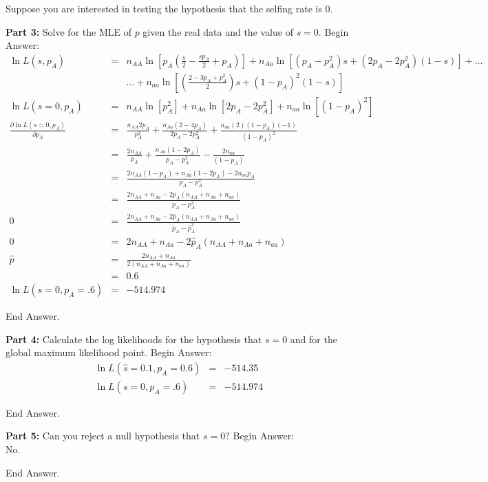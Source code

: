 \documentclass[11pt]{article}
\newcommand{\answer}[1]{{\color{red}\sc Begin Answer:\\}#1{\par\color{red}\sc End Answer.\\}}
\begin{document}
Suppose you are interested in testing the hypothesis that the selfing rate is 0.
\begin{compactenum}
	\item[{\bf Part 3:}] Solve for the MLE of $p$ given the real data and the value of $s = 0$.
\answer{
\begin{eqnarray*}
\ln L (s, p_A) & = &  n_{AA}\ln\left[p_A\left(\frac{s}{2} - \frac{sp_A}{2} + p_A\right)\right] + n_{Aa}\ln\left[(p_A - p_A^2)s + (2p_A - 2p_A^2)(1-s)\right] + \ldots \\
 & & \ldots + n_{aa}\ln\left[\left(\frac{2 - 3p_A + p_A^2}{2}\right)s + (1-p_A)^2(1-s)\right] \\
\ln L (s=0, p_A) & = &   n_{AA}\ln\left[p_A^2\right] + n_{Aa}\ln\left[2p_A - 2p_A^2\right] + n_{aa}\ln\left[(1-p_A)^2\right] \\
\frac{\partial\ln L (s=0, p_A)}{\partial p_A} & = &  \frac{n_{AA}2p_A}{p_A^2} + \frac{n_{Aa}(2-4p_A)}{2p_A - 2p_A^2} + \frac{n_{aa}(2)(1-p_A)(-1)}{(1-p_A)^2}\\
& = &  \frac{2n_{AA}}{p_A} + \frac{n_{Aa}(1-2p_A)}{p_A - p_A^2} - \frac{2n_{aa}}{(1-p_A)}\\
& = &  \frac{2n_{AA}(1-p_A) + n_{Aa}(1-2p_A)- 2n_{aa}p_A}{p_A - p_A^2}\\
& = &  \frac{2n_{AA} + n_{Aa} -2p_A (n_{AA} + n_{Aa} + n_{aa})}{p_A - p_A^2}\\
0 & = &  \frac{2n_{AA} + n_{Aa} -2\hat p_A (n_{AA} + n_{Aa} + n_{aa})}{\hat p_A - \hat p_A^2}\\
0 & = &  2n_{AA} + n_{Aa} -2\hat p_A (n_{AA} + n_{Aa} + n_{aa})\\
\hat p & = &  \frac{2n_{AA} + n_{Aa}}{2(n_{AA} + n_{Aa} + n_{aa})} \\
	& = & 0.6\\
\ln L (s=0, p_A=.6) & = & -514.974
\end{eqnarray*}
}
	\item[{\bf Part 4:}] Calculate the log likelihoods for the hypothesis that $s=0$ and  for the global maximum likelihood point.
\answer{
\begin{eqnarray*}
	\ln L (\hat s=0.1, p_A=0.6)& = & -514.35 \\
	\ln L (s=0, p_A=.6) & = & -514.974
\end{eqnarray*}
}
	\item[{\bf Part 5:}] Can you reject a null hypothesis that $s=0$?
\answer{
No.
}
\end{compactenum}
\end{document}
